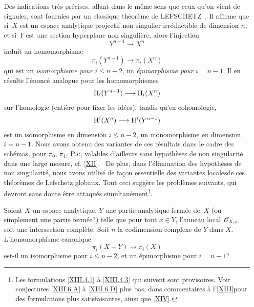 Des indications tr\`es pr\'ecises, allant dans le m\^eme sens que ceux qu'on vient de signaler, sont fournies par un classique th\'eor\`eme de LEFSCHETZ~\cite{XIII.7}. Il affirme que si~$X$ est un espace analytique projectif non singulier irr\'eductible de dimension $n$, et si~$Y$ est une section hyperplane non singuli\`ere, alors l'injection
$$Y^{n-1}\to X^n$$
induit un homomorphisme
$$
\pi_i(Y^{n-1})\to \pi_i(X^n)$$
qui est un \emph{isomorphisme pour} $i\le n-2$, un \emph{épimorphisme pour} $i=n-1$. Il en r\'esulte l'\'enonc\'e analogue pour les homomorphismes
$$
\H_i(Y^{n-1})\to \H_i(X^n)$$
sur l'homologie (enti\`ere pour fixer les id\'ees), tandis qu'en cohomologie,
$$
\H^i(X^n)\to\H^i(Y^{n-1})
$$
est un isomorphisme en dimension $i\le n-2$, un monomorphisme en dimension $i=n-1$. Nous avons obtenu des variantes de ces r\'esultats dans le cadre des sch\'emas, pour $\pi_0$, $\pi_1$, $\operatorname{Pic}$, valables d'ailleurs sans hypoth\`eses de non singularit\'e dans une large mesure, cf. \Exp \ref{XII}. \ De plus, dans l'\'elimination des hypoth\`eses de non singularit\'e, nous avons utilis\'e de fa\c con essentielle des variantes \og locales\fg de ces th\'eor\`emes de Lefschetz globaux. Tout ceci sugg\`ere les probl\`emes suivants, qui devront sans doute \^etre attaqu\'es simultan\'ement\footnote{Les formulations \ref{XIII.4.1} \`a \ref{XIII.4.3} qui suivent sont provisoires. Voir conjectures \ref{XIII.6.A} \`a \ref{XIII.6.D} plus bas, dans \og commentaires \`a l'\Exp \ref{XIII}\fg pour des formulations plus satisfaisantes, ainsi que \Exp \ref{XIV}.}.

\begin{probleme} \label{XIII.4.1}
Soient $X$ un espace analytique, $Y$ une partie analytique ferm\'ee de~$X$ (ou simplement une partie ferm\'ee?) telle que pour tout $x\in Y$, l'anneau local $\mathscr{O}_{X, x}$ soit une intersection compl\`ete. Soit $n$ la codimension complexe de $Y$ dans $X$. L'homomorphisme canonique
$$
\pi_i(X-Y)\to \pi_i(X)$$
est-il un isomorphisme pour $i\le n-2$, et un \'epimorphisme pour $i=n-1$?
\end{probleme}

